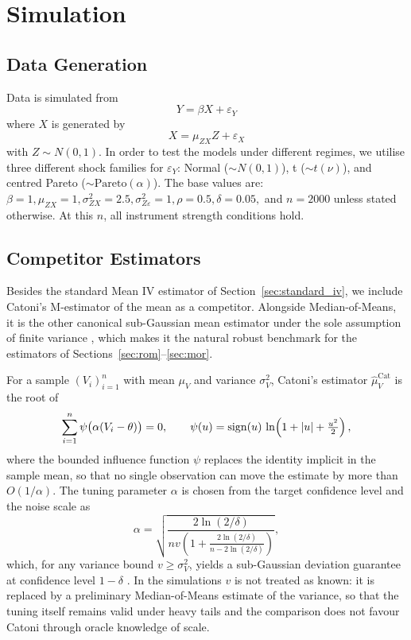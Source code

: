\section{Simulation}

\subsection{Data Generation}
Data is simulated from
\[
Y = \beta X + \varepsilon_Y
\]
where $X$ is generated by 
\[
X = \mu_{ZX}Z + \varepsilon_X
\]
with $Z \sim N(0,1)$. In order to test the models under different regimes, we utilise three different shock families for $\varepsilon_Y$: Normal ($\sim N(0,1)$), t ($\sim t(\nu)$), and centred Pareto ($\sim \mathrm{Pareto}(\alpha)$). The base values are: $\beta = 1, \mu_{ZX}=1, \sigma^2_{ZX}=2.5, \sigma^2_{Z\varepsilon}=1, \rho=0.5, \delta=0.05,$ and $ n=2000$ unless stated otherwise. At this $n$, all instrument strength conditions hold.

\subsection{Competitor Estimators}
\label{sec:sim_catoni}

Besides the standard Mean IV estimator of Section~\ref{sec:standard_iv}, we include Catoni's M-estimator of the mean \citep{catoni2012challenging} as a competitor. Alongside Median-of-Means, it is the other canonical sub-Gaussian mean estimator under the sole assumption of finite variance \citep{devroye2016sub}, which makes it the natural robust benchmark for the estimators of Sections~\ref{sec:rom}--\ref{sec:mor}.

For a sample $(V_i)_{i=1}^{n}$ with mean $\mu_V$ and variance $\sigma_V^2$, Catoni's estimator $\hat{\mu}_V^{\mathrm{Cat}}$ is the root of
\[
    \sum_{i=1}^{n} \psi\bigl(\alpha(V_i - \theta)\bigr) = 0,
    \qquad
    \psi(u) = \mathrm{sign}(u)\,\ln\!\left(1 + \left|u\right| + \tfrac{u^2}{2}\right),
\]
where the bounded influence function $\psi$ replaces the identity implicit in the sample mean, so that no single observation can move the estimate by more than $O(1/\alpha)$. The tuning parameter $\alpha$ is chosen from the target confidence level and the noise scale as
\[
    \alpha = \sqrt{\frac{2\ln(2/\delta)}{n v \left(1 + \frac{2\ln(2/\delta)}{n - 2\ln(2/\delta)}\right)}},
\]
which, for any variance bound $v \geq \sigma_V^2$, yields a sub-Gaussian deviation guarantee at confidence level $1-\delta$ \citep{catoni2012challenging}. In the simulations $v$ is not treated as known: it is replaced by a preliminary Median-of-Means estimate of the variance, so that the tuning itself remains valid under heavy tails and the comparison does not favour Catoni through oracle knowledge of scale.

